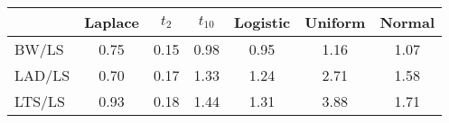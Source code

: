 %
\begin{center}
\begin{tabular}{|l||c|c|c|c|c|c|} \hline
\multicolumn{1}{|l||}{}&\multicolumn{1}{c|}{Laplace}&\multicolumn{1}{c|}{$t_2$}&\multicolumn{1}{c|}{$t_{10}$}&\multicolumn{1}{c|}{Logistic}&\multicolumn{1}{c|}{Uniform}&\multicolumn{1}{c|}{Normal}\\ \hline
BW/LS&0.75&0.15&0.98&0.95&1.16&1.07\\ 
LAD/LS&0.70&0.17&1.33&1.24&2.71&1.58\\ 
LTS/LS&0.93&0.18&1.44&1.31&3.88&1.71\\ 
\hline
\end{tabular}
\end{center}
